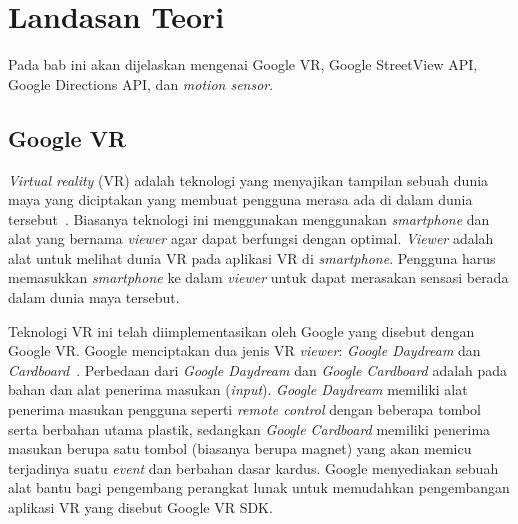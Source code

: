 \chapter{Landasan Teori}
\label{chap:teori}
Pada bab ini akan dijelaskan mengenai Google VR, Google StreetView API, Google Directions API, dan \textit{motion sensor}.

\section{Google VR}
\label{sec:google-vr} 
\textit{Virtual reality} (VR) adalah teknologi yang menyajikan tampilan sebuah dunia maya yang diciptakan yang membuat pengguna merasa ada di dalam dunia tersebut~\cite{vr-def}. Biasanya teknologi ini menggunakan menggunakan \textit{smartphone} dan alat yang bernama \textit{viewer} agar dapat berfungsi dengan optimal. \textit{Viewer} adalah alat untuk melihat dunia VR pada aplikasi VR di \textit{smartphone}. Pengguna harus memasukkan \textit{smartphone} ke dalam \textit{viewer} untuk dapat merasakan sensasi berada dalam dunia maya tersebut.

Teknologi VR ini telah diimplementasikan oleh Google yang disebut dengan Google VR. Google menciptakan dua jenis VR \textit{viewer}: \textit{Google Daydream} dan \textit{Cardboard}~\cite{quickstart-google-vr}. Perbedaan dari \textit{Google Daydream} dan \textit{Google Cardboard} adalah pada bahan dan alat penerima masukan (\textit{input}). \textit{Google Daydream} memiliki alat penerima masukan pengguna seperti \textit{remote control} dengan beberapa tombol serta berbahan utama plastik, sedangkan \textit{Google Cardboard} memiliki penerima masukan berupa satu tombol (biasanya berupa magnet) yang akan memicu terjadinya suatu \textit{event} dan berbahan dasar kardus. Google menyediakan sebuah alat bantu bagi pengembang perangkat lunak untuk memudahkan pengembangan aplikasi VR yang disebut Google VR SDK.

